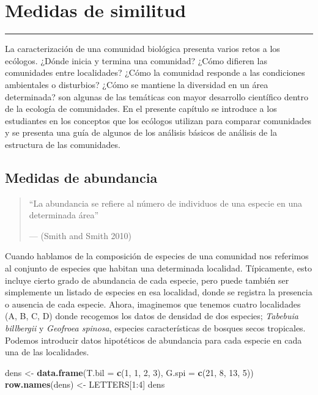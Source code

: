 \documentclass[]{book}
\newenvironment{Shaded}{\begin{snugshade}}{\end{snugshade}}
\newcommand{\KeywordTok}[1]{\textcolor[rgb]{0.13,0.29,0.53}{\textbf{{#1}}}}
\newcommand{\DataTypeTok}[1]{\textcolor[rgb]{0.13,0.29,0.53}{{#1}}}
\newcommand{\DecValTok}[1]{\textcolor[rgb]{0.00,0.00,0.81}{{#1}}}
\newcommand{\StringTok}[1]{\textcolor[rgb]{0.31,0.60,0.02}{{#1}}}
\newcommand{\NormalTok}[1]{{#1}}
\begin{document}
\chapter{Medidas de similitud}\label{medidas-de-similitud}

\begin{center}\rule{0.5\linewidth}{\linethickness}\end{center}

La caracterización de una comunidad biológica presenta varios retos a
los ecólogos. ¿Dónde inicia y termina una comunidad? ¿Cómo difieren las
comunidades entre localidades? ¿Cómo la comunidad responde a las
condiciones ambientales o disturbios? ¿Cómo se mantiene la diversidad en
un área determinada? son algunas de las temáticas con mayor desarrollo
científico dentro de la ecología de comunidades. En el presente capítulo
se introduce a los estudiantes en los conceptos que los ecólogos
utilizan para comparar comunidades y se presenta una guía de algunos de
los análisis básicos de análisis de la estructura de las comunidades.

\section{Medidas de abundancia}\label{medidas-de-abundancia}

\begin{quote}
``La abundancia se refiere al número de individuos de una especie en una
determinada área''

--- (Smith and Smith 2010)
\end{quote}

Cuando hablamos de la composición de especies de una comunidad nos
referimos al conjunto de especies que habitan una determinada localidad.
Típicamente, esto incluye cierto grado de abundancia de cada especie,
pero puede también ser simplemente un listado de especies en esa
localidad, donde se registra la presencia o ausencia de cada especie.
Ahora, imaginemos que tenemos cuatro localidades (A, B, C, D) donde
recogemos los datos de densidad de dos especies; \emph{Tabebuia
billbergii} y \emph{Geofroea spinosa}, especies características de
bosques secos tropicales. Podemos introducir datos hipotéticos de
abundancia para cada especie en cada una de las localidades.

\begin{Shaded}
\begin{Highlighting}[]
\NormalTok{dens <-}\StringTok{ }\KeywordTok{data.frame}\NormalTok{(}\DataTypeTok{T.bil =} \KeywordTok{c}\NormalTok{(}\DecValTok{1}\NormalTok{, }\DecValTok{1}\NormalTok{, }\DecValTok{2}\NormalTok{, }\DecValTok{3}\NormalTok{), }\DataTypeTok{G.spi =} \KeywordTok{c}\NormalTok{(}\DecValTok{21}\NormalTok{, }\DecValTok{8}\NormalTok{, }\DecValTok{13}\NormalTok{, }\DecValTok{5}\NormalTok{)) }
\KeywordTok{row.names}\NormalTok{(dens) <-}\StringTok{ }\NormalTok{LETTERS[}\DecValTok{1}\NormalTok{:}\DecValTok{4}\NormalTok{]}
\NormalTok{dens}
\end{Highlighting}
\end{Shaded}
\end{document}
